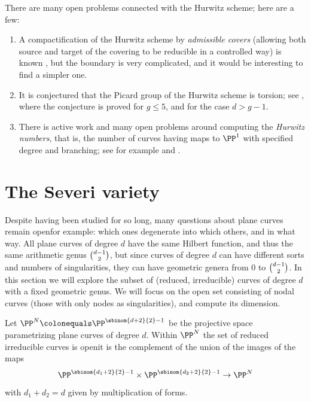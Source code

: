 There are many open problems connected with the Hurwitz scheme; here are a few:
\begin{enumerate}
\item A compactification of the Hurwitz scheme by 
%
\emph{admissible covers} 
(allowing both source and target
of the covering to be reducible in a controlled way) is known \cite{MR1631825}, but the boundary is very complicated, and it would be interesting to find a simpler one.

\item It is conjectured that the 
Picard group
%
of the Hurwitz scheme is torsion; see \cite{MR3320849}, 
where the conjecture is proved
for $g\leq 5$, and \cite{mullane} for the case $d>g-1$.

\item There is active work and many open problems around computing the 
\emph{Hurwitz numbers}, 
% 
that is,
the number of curves having maps to $\PP^{1}$ with specified degree and branching; see for example \cite{Hurwitz2} and \cite{ELSV}.
\end{enumerate}

\section{The Severi variety}\label{severi variety}

Despite having been studied for so long, many questions about plane
curves remain open\emdash for example: which ones degenerate into
which others, and in what way. All plane curves of degree $d$ have the
same Hilbert function, and thus the same 
arithmetic genus
%
$\tbinom{d-1}{2}$, but since curves of degree $d$ can have different
sorts and numbers of singularities, they can have geometric genera
from 0 to $\tbinom{d-1}{2}$. In this section we will explore the
subset of (reduced, irreducible) curves of degree $d$ with a fixed
%
geometric genus. We will focus on the open set consisting of
nodal curves (those with only nodes as singularities),
and compute its dimension.

\def\Vdg{V_{\,d,g}}
\def\Vdgbar{\overkern1{15}{\Vdg}}
\def\Vdgpbar{\overkern1{19}{V_{\smash{\!d,g'`}}}}

Let $\PP^N \colonequals  \PP^{\sbinom{d+2}{ 2} - 1}$ be the projective space parametrizing plane curves of degree $d$.
Within $\PP^N$ the set of reduced irreducible curves is open\emdash it is the complement of the union of the images of the maps
$$
\PP^{\sbinom{d_1+2}{ 2} - 1}\times\PP^{\sbinom{d_2+2}{ 2}-1} \to \PP^N
$$
with $d_1+d_2 = d$ given by multiplication of forms.

